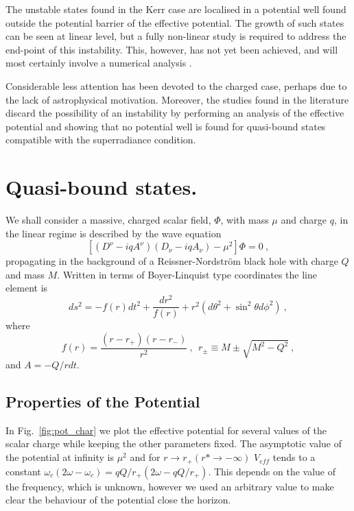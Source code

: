 \documentclass[aps, prd, twocolumn, amsmath, floats,floatfix, superscriptaddress,
nofootinbib, showpacs]{revtex4-1}
\def\be{\begin{equation}}
\def\ee{\end{equation}}
\begin{document}
The unstable states found in the Kerr case are  localised in a potential well found
outside the potential barrier of the effective potential. The growth of such states can be
seen at linear level, but  a fully
non-linear study is required to address the end-point of this instability. This, however, 
has not yet been achieved, and will most certainly involve a numerical analysis 
\cite{Witek:2010qc}.  


Considerable less attention has been devoted to the charged case, perhaps due to the 
lack of astrophysical motivation. Moreover, the studies found in the literature
\cite{Furuhashi:2004jk,Hod:2012zz} discard the possibility of an instability by performing
an analysis of the effective potential and showing that no potential well is found for
quasi-bound states compatible with the superradiance condition. 



\section{Quasi-bound states.}
\label{sec:bound-states}
We shall consider a massive, charged scalar field, $\Phi$, with mass $\mu$ and charge $q$,
in the linear regime is described by the wave equation
\begin{equation}
\left[(D^\nu-iqA^\nu)(D_\nu-iqA_\nu)-\mu^2\right]\Phi=0 \ ,
\label{eq:we}
\end{equation}
propagating in the background of a Reissner-Nordstr\"om black hole with charge $Q$ and
mass $M$. Written in terms of Boyer-Linquist type coordinates the line element is 
\begin{equation}
ds^2=-f(r)dt^2+\frac{dr^2}{f(r)}+r^2(d\theta^2+\sin^2\theta d\phi^2) \ ,  
\end{equation}
where 
\be
f(r)=\frac{(r-r_+)(r-r_-)}{r^2} \ , \ \ r_\pm\equiv M\pm\sqrt{M^2-Q^2} \ ,
\ee
and $A=-Q/rdt$.

\subsection{Properties of the Potential}
\label{sec:potential}
In Fig.~\ref{fig:pot_char} we plot the effective potential for several values of the
scalar charge while keeping the other parameters fixed. The asymptotic value of the
potential at infinity is $\mu^2$ and for $r\rightarrow r_{+} (r* \rightarrow -\infty)$
$V_{eff}$ tends to a constant $\omega_c(2\omega-\omega_c) = qQ/r_{+} (2\omega -
qQ/r_{+})$. This depends on the value of the frequency, which is unknown, however we used
an arbitrary value to make clear the behaviour of the potential close the horizon. 
\end{document}
